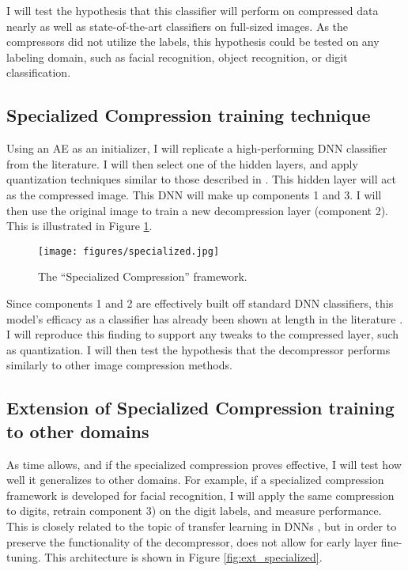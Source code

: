 \documentclass[twoside,11pt]{article}
\begin{document}
I will test the hypothesis that this classifier will perform on compressed data nearly as well as state-of-the-art classifiers on full-sized images. As the compressors did not utilize the labels, this hypothesis could be tested on any labeling domain, such as facial recognition, object recognition, or digit classification.

\subsection{Specialized Compression training technique} \label{special}

Using an AE as an initializer, I will replicate a high-performing DNN classifier
 from the literature. I will then select one of the hidden layers, and apply 
quantization techniques similar to those described in \citet{hubara2018}. This hidden layer 
will act as the compressed image. This DNN will make up components 1 and 3. I 
will then use the original image to train a new decompression layer (component 2).  
This is illustrated in Figure \ref{fig:specialized}.

\begin{figure}
  \texttt{[image: figures/specialized.jpg]}
  \caption{The “Specialized Compression” framework.}
  \label{fig:specialized}
\end{figure}

Since components 1 and 2 are effectively built off standard DNN classifiers, 
this model’s efficacy as a classifier has already been shown at length in the 
literature \citep{krizhevsky2012imagenet}. I will reproduce this finding to support 
any tweaks to the compressed layer, such as quantization. I will then test the 
hypothesis that the decompressor performs similarly to other image compression methods.

\subsection{Extension of Specialized Compression training to other domains}

As time allows, and if the specialized compression proves effective, I will test 
how well it generalizes to other domains. For example, if a specialized compression 
framework is developed for facial recognition, I will apply the same compression 
to digits, retrain component 3) on the digit labels, and measure performance. 
This is closely related to the topic of transfer learning in DNNs \citep{yosinski2014}, 
but in order to preserve the functionality of the decompressor, does not allow for 
early layer fine-tuning.
This architecture is shown in Figure \ref{fig:ext_specialized}.
\end{document}
